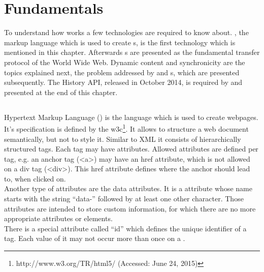 \section{Fundamentals}

To understand how \lare{} works a few technologies are required to know about.
\html{}, the markup language which is used to create \webPage{}s, is the first technology which is mentioned in this chapter.
Afterwards \httpRequest{}s are presented as the fundamental transfer protocol of the World Wide Web.
Dynamic content and synchronicity are the topics explained next, the problem addressed by \ajax{} and \singlePageApplication{}s, which are presented subsequently.
The History API, released in October 2014, is required by \lare{} and presented at the end of this chapter.

\subsection{\html{}\label{html}}
Hypertext Markup Language (\html{}) is the language which is used to create webpages.
It's specification is defined by the \gls{w3c}\footnote{http://www.w3.org/TR/html5/ (Accessed: June 24, 2015)}.
It allows to structure a web document semantically, but not to style it.
Similar to XML it consists of hierarchically structured tags.
Each tag may have attributes.
Allowed attributes are defined per tag, e.g. an anchor tag (<a>) may have an href attribute, which is not allowed on a div tag (<div>).
This href attribute defines where the anchor should lead to, when clicked on.
\\
Another type of attributes are the data attributes.
It is a attribute whose name starts with the string \enquote{data-} followed by at least one other character.
Those attributes are intended to store custom information, for which there are no more appropriate attributes or elements.
\\
There is a special attribute called \enquote{id} which defines the unique identifier of a tag.
Each value of it may not occur more than once on a \webPage{}.


